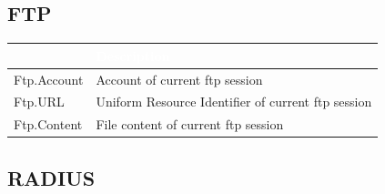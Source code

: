 \subsection*{\hypertarget{link:FTP}{FTP}}
\label{sec:appendix_c:protocol:FTP}

\begin{longtable}{p{}|p{}}   
    \rowcolor{black}\multicolumn{1}{l!\vlinewhite}{\textcolor{white}{Field}}  & \textcolor{white}{Description} \\\hline
    Ftp.Account &	Account of current ftp session \\\hline
    Ftp.URL &	Uniform Resource Identifier of current ftp session \\\hline
    Ftp.Content &	File content of current ftp session   \\\hline
\end{longtable} 

\subsection*{\hypertarget{link:RADIUS}{RADIUS}}
\label{sec:appendix_c:protocol:RADIUS}

